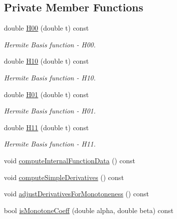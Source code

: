 \subsection*{Private Member Functions}
\begin{DoxyCompactItemize}
\item 
\hypertarget{class_opm_1_1_monot_cubic_interpolator_a230b148ef09fed6a279f369fdd9847f9}{}double \hyperlink{class_opm_1_1_monot_cubic_interpolator_a230b148ef09fed6a279f369fdd9847f9}{H00} (double t) const \label{class_opm_1_1_monot_cubic_interpolator_a230b148ef09fed6a279f369fdd9847f9}

\begin{DoxyCompactList}\small\item\em Hermite Basis function -\/ H00. \end{DoxyCompactList}\item 
\hypertarget{class_opm_1_1_monot_cubic_interpolator_ac0fdcab4f1e44cd828b56dee39c0ce6a}{}double \hyperlink{class_opm_1_1_monot_cubic_interpolator_ac0fdcab4f1e44cd828b56dee39c0ce6a}{H10} (double t) const \label{class_opm_1_1_monot_cubic_interpolator_ac0fdcab4f1e44cd828b56dee39c0ce6a}

\begin{DoxyCompactList}\small\item\em Hermite Basis function -\/ H10. \end{DoxyCompactList}\item 
\hypertarget{class_opm_1_1_monot_cubic_interpolator_a35c50499a60debc0e0505243c4cf0ade}{}double \hyperlink{class_opm_1_1_monot_cubic_interpolator_a35c50499a60debc0e0505243c4cf0ade}{H01} (double t) const \label{class_opm_1_1_monot_cubic_interpolator_a35c50499a60debc0e0505243c4cf0ade}

\begin{DoxyCompactList}\small\item\em Hermite Basis function -\/ H01. \end{DoxyCompactList}\item 
\hypertarget{class_opm_1_1_monot_cubic_interpolator_a9a337b2d5f0e5819c292a0f7574833f8}{}double \hyperlink{class_opm_1_1_monot_cubic_interpolator_a9a337b2d5f0e5819c292a0f7574833f8}{H11} (double t) const \label{class_opm_1_1_monot_cubic_interpolator_a9a337b2d5f0e5819c292a0f7574833f8}

\begin{DoxyCompactList}\small\item\em Hermite Basis function -\/ H11. \end{DoxyCompactList}\item 
void \hyperlink{class_opm_1_1_monot_cubic_interpolator_a0fb655f39c0428a162e0bab3a9dfab03}{compute\+Internal\+Function\+Data} () const 
\item 
void \hyperlink{class_opm_1_1_monot_cubic_interpolator_a3d03d08341bfd5e7ebaee7c58fed9bfc}{compute\+Simple\+Derivatives} () const 
\item 
void \hyperlink{class_opm_1_1_monot_cubic_interpolator_ae8a470ce196ba2dbf882dd1cf86d1567}{adjust\+Derivatives\+For\+Monotoneness} () const 
\item 
bool \hyperlink{class_opm_1_1_monot_cubic_interpolator_a6d2b977b318a7c78e2156105b9384837}{is\+Monotone\+Coeff} (double alpha, double beta) const 
\end{DoxyCompactItemize}
